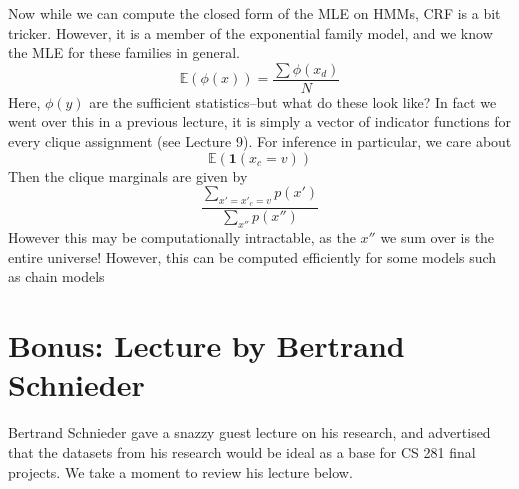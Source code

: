 \documentclass{article}
\begin{document}
Now while we can compute the closed form of the MLE on HMMs, CRF is a bit tricker. However, it is a member of the exponential family model, and we know the MLE for these families in general.
\[
\mathbb{E}(\phi(x)) = \frac{\sum \phi(x_d)}{N}
\]
Here, $\phi(y)$ are the sufficient statistics--but what do these look like? In fact we went over this in a previous lecture, it is simply a vector of indicator functions for every clique assignment (see Lecture 9). For inference in particular, we care about
\[
\mathbb{E}(\textbf{1}(x_c=v))
\]
Then the clique marginals are given by
\[
\frac{\sum\limits_{x'=x'_c=v} p(x')}{\sum\limits_{x''}p(x'')}
\]
However this may be computationally intractable, as the $x''$ we sum over is the entire universe! However, this can be computed efficiently for some models such as chain models

\section{Bonus: Lecture by Bertrand Schnieder}

Bertrand Schnieder gave a snazzy guest lecture on his research, and advertised that the datasets from his research would be ideal as a base for CS 281 final projects.  We take a moment to review his lecture below.
\end{document}
